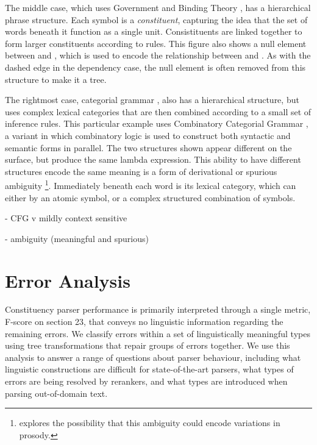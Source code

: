 The middle case, which uses Government and Binding Theory \parencite{gb}, has a hierarchical phrase structure.
Each symbol is a \textit{constituent}, capturing the idea that the set of words beneath it function as a single unit.
Consistituents are linked together to form larger constituents according to rules.
This figure also shows a null element between  and , which is used to encode the relationship between  and .
As with the dashed edge in the dependency case, the null element is often removed from this structure to make it a tree.

The rightmost case, categorial grammar \parencite{categorial-grammar}, also has a hierarchical structure, but uses complex lexical categories that are then combined according to a small set of inference rules.
This particular example uses Combinatory Categorial Grammar \parencite[CCG][]{Steedman:2000}, a variant in which combinatory logic is used to construct both syntactic and semantic forms in parallel.
The two structures shown appear different on the surface, but produce the same lambda expression.
This ability to have different structures encode the same meaning is a form of derivational or spurious ambiguity
\footnote{\textcite{Steedman:2000} explores the possibility that this ambiguity could encode variations in prosody.}.
Immediately beneath each word is its lexical category, which can either by an atomic symbol, or a complex structured combination of symbols.

 - CFG v mildly context sensitive

 - ambiguity (meaningful and spurious)

\section{Error Analysis}

Constituency parser performance is primarily interpreted through a single
metric, F-score on \wsj section 23, that conveys no linguistic information
regarding the remaining errors.  We classify errors within a set of
linguistically meaningful types using tree transformations that repair groups
of errors together.  We use this analysis to answer a range of questions about
parser behaviour, including what linguistic constructions are difficult for
state-of-the-art parsers, what types of errors are being resolved by rerankers,
and what types are introduced when parsing out-of-domain text.


